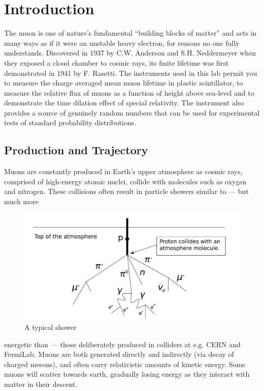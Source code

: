 \documentclass[aps,prb,groupedaddress,notitlepage,nofootinbib]{revtex4-1} %
\begin{document}
\newpage

\section{Introduction}

The muon is one of nature’s fundamental “building blocks of matter” and acts in many
ways as if it were an unstable heavy electron, for reasons no one fully understands.
Discovered in 1937 by C.W. Anderson and S.H. Neddermeyer when they exposed a
cloud chamber to cosmic rays, its finite lifetime was first demonstrated in 1941 by F.
Rasetti. The instruments used in this lab permit you to measure the charge
averaged mean muon lifetime in plastic scintillator, to measure the relative flux of muons
as a function of height above sea-level and to demonstrate the time dilation effect of
special relativity. The instrument also provides a source of genuinely random numbers
that can be used for experimental tests of standard probability distributions.

\subsection{Production and Trajectory}
Muons are constantly produced in Earth's upper atmosphere as cosmic rays, comprised of high-energy atomic nuclei, collide with molecules such as oxygen and nitrogen. These collisions often result in particle showers similar to --- but much more 
\begin{figure}
	\captionsetup{format=plain}
	\centering
	\includegraphics[width=4.5 in]{particleshower}
	\caption{A typical shower}
\end{figure}
 energetic than --- those deliberately produced in colliders at e.g. CERN and FermiLab. Muons are both generated directly and indirectly (via decay of charged mesons), and often carry relativistic amounts of kinetic energy. Some muons will scatter towards earth, gradually losing energy as they interact with matter in their descent.
\end{document}
